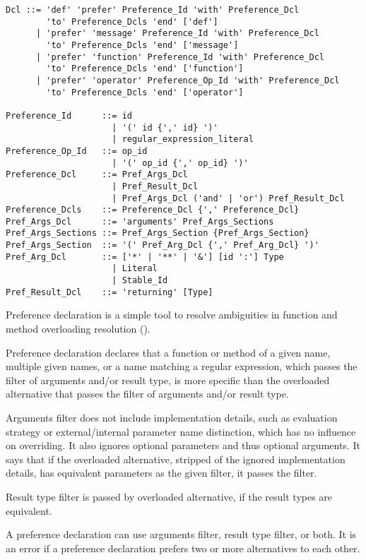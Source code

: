 \syntax\begin{lstlisting}
Dcl ::= 'def' 'prefer' Preference_Id 'with' Preference_Dcl 
        'to' Preference_Dcls 'end' ['def']
      | 'prefer' 'message' Preference_Id 'with' Preference_Dcl 
        'to' Preference_Dcls 'end' ['message']
      | 'prefer' 'function' Preference_Id 'with' Preference_Dcl 
        'to' Preference_Dcls 'end' ['function']
      | 'prefer' 'operator' Preference_Op_Id 'with' Preference_Dcl 
        'to' Preference_Dcls 'end' ['operator']

Preference_Id      ::= id 
                     | '(' id {',' id} ')' 
                     | regular_expression_literal
Preference_Op_Id   ::= op_id 
                     | '(' op_id {',' op_id} ')'
Preference_Dcl     ::= Pref_Args_Dcl 
                     | Pref_Result_Dcl 
                     | Pref_Args_Dcl ('and' | 'or') Pref_Result_Dcl
Preference_Dcls    ::= Preference_Dcl {',' Preference_Dcl}
Pref_Args_Dcl      ::= 'arguments' Pref_Args_Sections
Pref_Args_Sections ::= Pref_Args_Section {Pref_Args_Section}
Pref_Args_Section  ::= '(' Pref_Arg_Dcl {',' Pref_Arg_Dcl} ')'
Pref_Arg_Dcl       ::= ['*' | '**' | '&'] [id ':'] Type
                     | Literal
                     | Stable_Id
Pref_Result_Dcl    ::= 'returning' [Type]
\end{lstlisting}

Preference declaration is a simple tool to resolve ambiguities in function and method overloading resolution (). 

Preference declaration declares that a function or method of a given name, multiple given names, or a name matching a regular expression, which passes the filter of arguments and/or result type, is more specific than the overloaded alternative that passes the filter of arguments and/or result type. 

Arguments filter does not include implementation details, such as evaluation strategy or external/internal parameter name distinction, which has no influence on overriding. It also ignores optional parameters and thus optional arguments. It says that if the overloaded alternative, stripped of the ignored implementation details, has equivalent parameters as the given filter, it passes the filter.

Result type filter is passed by overloaded alternative, if the result types are equivalent. 

A preference declaration can use arguments filter, result type filter, or both. It is an error if a preference declaration prefers two or more alternatives to each other. 

